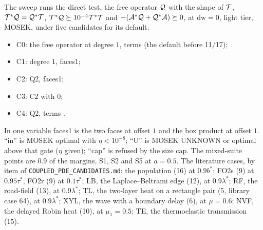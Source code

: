 The sweep runs the direct test, the free operator $\mathcal{Q}$ with the shape of $\mathcal{T}$, $\mathcal{T}^*\mathcal{Q}=\mathcal{Q}^*\mathcal{T}$, $\mathcal{T}^*\mathcal{Q}\succeq10^{-4}\mathcal{T}^*\mathcal{T}$ and $-(\mathcal{A}^*\mathcal{Q}+\mathcal{Q}^*\mathcal{A})\succeq0$, at $\mathrm{dw}=0$, light tier, MOSEK, under five candidates for its default:
\begin{itemize}\setlength\itemsep{0pt}
\item C0: the free operator at degree $1$, terms  (the default before 11/17);
\item C1: degree $1$, faces1;
\item C2: Q2, faces1;
\item C3: C2 with  $0$;
\item C4: Q2, terms .
\end{itemize}
In one variable faces1 is the two faces at offset $1$ and  the box product at offset $1$. ``in'' is MOSEK optimal with $\eta<10^{-8}$; ``U'' is MOSEK UNKNOWN or optimal above that gate ($\eta$ given); ``cap'' is refused by the size cap. The mixed-suite points are $0.9$ of the margins, S1, S2 and S5 at $a=0.5$. The literature cases, by item of \texttt{COUPLED\_PDE\_CANDIDATES.md}: the population (16) at $0.9b^*$; FO2s (9) at $0.95\tau^*$, FO2r (9) at $0.1\tau^*$; LB, the Laplace--Beltrami edge (12), at $0.9\lambda^*$; RF, the road-field (13), at $0.9\lambda^*$; TL, the two-layer heat on a rectangle pair (5, library case 64), at $0.9\lambda^*$; XYL, the wave with a boundary delay (6), at $\mu=0.6$; NVF, the delayed Robin heat (10), at $\mu_1=0.5$; TE, the thermoelastic transmission (15).

